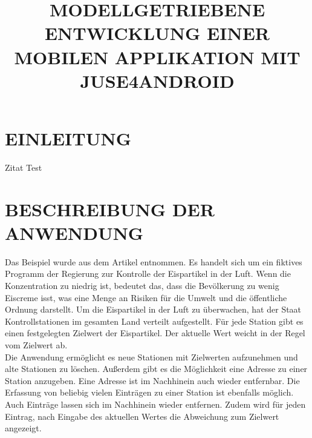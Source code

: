 \documentclass[a4paper,twoside]{article}
\begin{document}
\title{\uppercase{Modellgetriebene Entwicklung einer mobilen Applikation mit JUSE4Android}}

\author{
}




\onecolumn \maketitle \normalsize \vfill
\pagestyle{plain}
\section{\uppercase{Einleitung}}
\label{sec:introduction}
\noindent Zitat Test
\cite{SilvaMasterThesis}

\section{\uppercase{Beschreibung der Anwendung}}
\noindent
Das Beispiel wurde aus dem Artikel \cite{Gui06} entnommen. Es handelt sich um ein fiktives Programm der Regierung zur Kontrolle der Eispartikel in der Luft. Wenn die Konzentration zu niedrig ist, bedeutet das, dass die Bevölkerung zu wenig Eiscreme isst, was eine Menge an Risiken für die Umwelt und die öffentliche Ordnung darstellt. Um die Eispartikel in der Luft zu überwachen, hat der Staat Kontrollstationen im gesamten Land verteilt aufgestellt. Für jede Station gibt es einen festgelegten Zielwert der Eispartikel. Der aktuelle Wert weicht in der Regel vom Zielwert ab. 
\\
Die Anwendung ermöglicht es neue Stationen mit Zielwerten aufzunehmen und alte Stationen zu löschen. Außerdem gibt es die Möglichkeit eine Adresse zu einer Station anzugeben. Eine Adresse ist im Nachhinein auch wieder entfernbar. Die Erfassung von beliebig vielen Einträgen zu einer Station ist ebenfalls möglich. Auch Einträge lassen sich im Nachhinein wieder entfernen. Zudem wird für jeden Eintrag, nach Eingabe des aktuellen Wertes die Abweichung zum Zielwert angezeigt.
\end{document}
